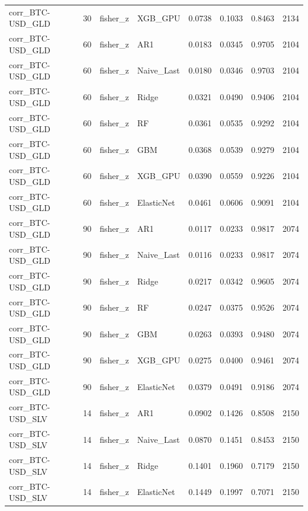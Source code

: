 \begin{table}[H]
\begin{tabular}{llllrrrr}
corr_BTC-USD_GLD & 30 & fisher_z & XGB_GPU & 0.0738 & 0.1033 & 0.8463 & 2134 \\
corr_BTC-USD_GLD & 60 & fisher_z & AR1 & 0.0183 & 0.0345 & 0.9705 & 2104 \\
corr_BTC-USD_GLD & 60 & fisher_z & Naive_Last & 0.0180 & 0.0346 & 0.9703 & 2104 \\
corr_BTC-USD_GLD & 60 & fisher_z & Ridge & 0.0321 & 0.0490 & 0.9406 & 2104 \\
corr_BTC-USD_GLD & 60 & fisher_z & RF & 0.0361 & 0.0535 & 0.9292 & 2104 \\
corr_BTC-USD_GLD & 60 & fisher_z & GBM & 0.0368 & 0.0539 & 0.9279 & 2104 \\
corr_BTC-USD_GLD & 60 & fisher_z & XGB_GPU & 0.0390 & 0.0559 & 0.9226 & 2104 \\
corr_BTC-USD_GLD & 60 & fisher_z & ElasticNet & 0.0461 & 0.0606 & 0.9091 & 2104 \\
corr_BTC-USD_GLD & 90 & fisher_z & AR1 & 0.0117 & 0.0233 & 0.9817 & 2074 \\
corr_BTC-USD_GLD & 90 & fisher_z & Naive_Last & 0.0116 & 0.0233 & 0.9817 & 2074 \\
corr_BTC-USD_GLD & 90 & fisher_z & Ridge & 0.0217 & 0.0342 & 0.9605 & 2074 \\
corr_BTC-USD_GLD & 90 & fisher_z & RF & 0.0247 & 0.0375 & 0.9526 & 2074 \\
corr_BTC-USD_GLD & 90 & fisher_z & GBM & 0.0263 & 0.0393 & 0.9480 & 2074 \\
corr_BTC-USD_GLD & 90 & fisher_z & XGB_GPU & 0.0275 & 0.0400 & 0.9461 & 2074 \\
corr_BTC-USD_GLD & 90 & fisher_z & ElasticNet & 0.0379 & 0.0491 & 0.9186 & 2074 \\
corr_BTC-USD_SLV & 14 & fisher_z & AR1 & 0.0902 & 0.1426 & 0.8508 & 2150 \\
corr_BTC-USD_SLV & 14 & fisher_z & Naive_Last & 0.0870 & 0.1451 & 0.8453 & 2150 \\
corr_BTC-USD_SLV & 14 & fisher_z & Ridge & 0.1401 & 0.1960 & 0.7179 & 2150 \\
corr_BTC-USD_SLV & 14 & fisher_z & ElasticNet & 0.1449 & 0.1997 & 0.7071 & 2150 \\
\bottomrule
\end{tabular}
\end{table}